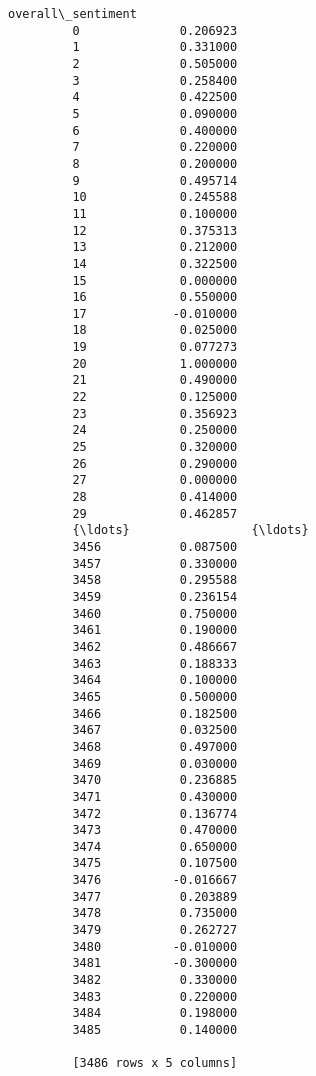 \documentclass[11pt]{article}
\begin{document}
\begin{Verbatim}[commandchars=\\\{\}]
               overall\_sentiment  
         0              0.206923  
         1              0.331000  
         2              0.505000  
         3              0.258400  
         4              0.422500  
         5              0.090000  
         6              0.400000  
         7              0.220000  
         8              0.200000  
         9              0.495714  
         10             0.245588  
         11             0.100000  
         12             0.375313  
         13             0.212000  
         14             0.322500  
         15             0.000000  
         16             0.550000  
         17            -0.010000  
         18             0.025000  
         19             0.077273  
         20             1.000000  
         21             0.490000  
         22             0.125000  
         23             0.356923  
         24             0.250000  
         25             0.320000  
         26             0.290000  
         27             0.000000  
         28             0.414000  
         29             0.462857  
         {\ldots}                 {\ldots}  
         3456           0.087500  
         3457           0.330000  
         3458           0.295588  
         3459           0.236154  
         3460           0.750000  
         3461           0.190000  
         3462           0.486667  
         3463           0.188333  
         3464           0.100000  
         3465           0.500000  
         3466           0.182500  
         3467           0.032500  
         3468           0.497000  
         3469           0.030000  
         3470           0.236885  
         3471           0.430000  
         3472           0.136774  
         3473           0.470000  
         3474           0.650000  
         3475           0.107500  
         3476          -0.016667  
         3477           0.203889  
         3478           0.735000  
         3479           0.262727  
         3480          -0.010000  
         3481          -0.300000  
         3482           0.330000  
         3483           0.220000  
         3484           0.198000  
         3485           0.140000  
         
         [3486 rows x 5 columns]
\end{Verbatim}
            
\end{document}
